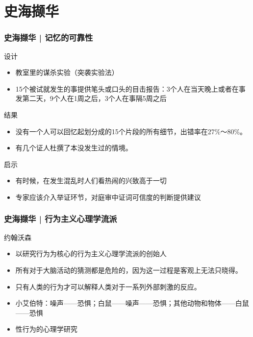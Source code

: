 \section{史海撷华}
\begin{frame}
  \frametitle{史海撷华 | 记忆的可靠性}
  \begin{block}{设计}
    \begin{itemize}
      \item 教室里的谋杀实验（突袭实验法）
      \item 15个被试就发生的事提供笔头或口头的目击报告：3个人在当天晚上或者在事发第二天，9个人在1周之后，3个人在事隔5周之后
    \end{itemize}
  \end{block}
  \pause
  \begin{block}{结果}
    \begin{itemize}
      \item 没有一个人可以回忆起划分成的15个片段的所有细节，出错率在27\%～80\%。
      \item 有几个证人杜撰了本没发生过的情境。
    \end{itemize}
  \end{block}
  \pause
  \begin{block}{启示}
    \begin{itemize}
      \item 有时候，在发生混乱时人们看热闹的兴致高于一切
      \item 专家应该介入举证环节，对庭审中证词可信度的判断提供建议
    \end{itemize}
  \end{block}
\end{frame}

\begin{frame}
  \frametitle{史海撷华 | 行为主义心理学流派}
  \begin{block}{约翰\textbullet 沃森}
    \begin{itemize}
      \item 以研究行为为核心的行为主义心理学流派的创始人
      \item 所有对于大脑活动的猜测都是危险的，因为这一过程是客观上无法只晓得。
      \item 只有人类的行为才可以解释人类对于一系列外部刺激的反应。
      \item 小艾伯特：噪声——恐惧；白鼠——噪声——恐惧；其他动物和物体——白鼠——恐惧
      \item 性行为的心理学研究
    \end{itemize}
  \end{block}
\end{frame}

